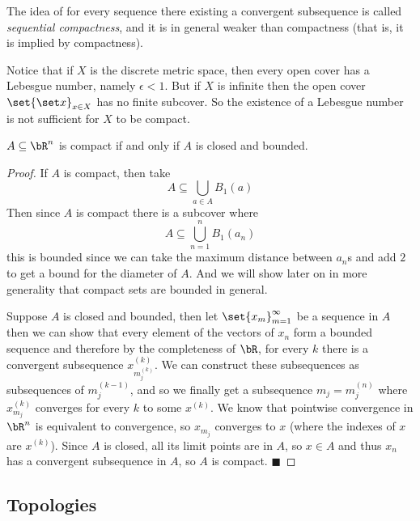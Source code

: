 \documentclass[10pt]{article}
\def\qed{\hskip1cm\penalty-100\hbox{}\hfill$\blacksquare$}
\begin{document}
The idea of for every sequence there existing a convergent subsequence is called \emph{sequential compactness}, and it is in general weaker than compactness (that is, it is implied by compactness).

\begin{exam*}

    Notice that if $X$ is the discrete metric space, then every open cover has a Lebesgue number, namely $\epsilon<1$.
    But if $X$ is infinite then the open cover $\set{\set x}_{x\in X}$ has no finite subcover.
    So the existence of a Lebesgue number is not sufficient for $X$ to be compact.

\end{exam*}

\begin{thrm*}

    $A\subseteq\bR^n$ is compact if and only if $A$ is closed and bounded.

\end{thrm*}

\begin{proof}

    If $A$ is compact, then take
    \[ A\subseteq\bigcup_{a\in A}B_1(a) \]
    Then since $A$ is compact there is a subcover where
    \[ A\subseteq\bigcup_{n=1}^n B_1(a_n) \]
    this is bounded since we can take the maximum distance between $a_n$s and add $2$ to get a bound for the diameter of $A$.
    And we will show later on in more generality that compact sets are bounded in general.

    Suppose $A$ is closed and bounded, then let $\set{x_m}_{m=1}^\infty$ be a sequence in $A$ then we can show that every element of the vectors of $x_n$ form a bounded sequence and therefore by the
    completeness of $\bR$, for every $k$ there is a convergent subsequence $x_{m_j^{(k)}}^{(k)}$.
    We can construct these subsequences as subsequences of $m_j^{(k-1)}$, and so we finally get a subsequence $m_j=m_j^{(n)}$ where $x_{m_j}^{(k)}$ converges for every $k$ to some $x^{(k)}$.
    We know that pointwise convergence in $\bR^n$ is equivalent to convergence, so $x_{m_j}$ converges to $x$ (where the indexes of $x$ are $x^{(k)}$).
    Since $A$ is closed, all its limit points are in $A$, so $x\in A$ and thus $x_n$ has a convergent subsequence in $A$, so $A$ is compact.
    \qed

\end{proof}

\subsection{Topologies}
\end{document}
